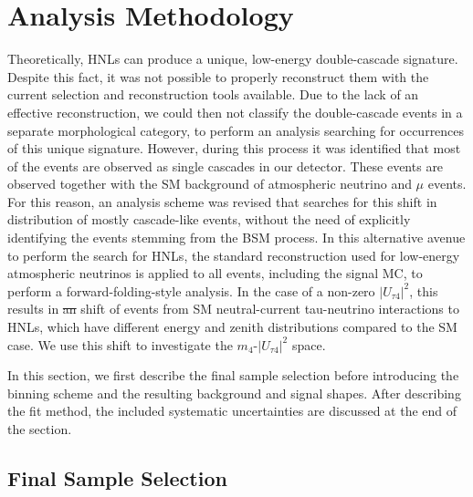 \documentclass[
    aps,
    prd,
    reprint,
    amsmath,
    amssymb,
    nofootinbib,
    superscriptaddress,
    floatfix
]{revtex4-2}
\def\ut4{$|U_{\tau4}|^2$}
\providecommand{\DIFaddtex}[1]{{\protect\color{blue}\uwave{#1}}} %
\providecommand{\DIFdeltex}[1]{{\protect\color{red}\sout{#1}}}                      %
\providecommand{\DIFaddbegin}{} %
\providecommand{\DIFaddend}{} %
\providecommand{\DIFdelbegin}{} %
\providecommand{\DIFdelend}{} %
\providecommand{\DIFadd}[1]{\texorpdfstring{\DIFaddtex{#1}}{#1}} %
\providecommand{\DIFdel}[1]{\texorpdfstring{\DIFdeltex{#1}}{}} %
\newcommand{\DIFscaledelfig}{0.5}
\newlength{\DIFdelgraphicswidth} %
\newlength{\DIFdelgraphicsheight} %
\newcommand{\DIFaddincludegraphics}[2][]{{\color{blue}\fbox{\DIFOincludegraphics[#1]{#2}}}} %
\newcommand{\DIFdelincludegraphics}[2][]{%
\sbox{\DIFdelgraphicsbox}{\DIFOincludegraphics[#1]{#2}}%
\settoboxwidth{\DIFdelgraphicswidth}{\DIFdelgraphicsbox} %
\settoboxtotalheight{\DIFdelgraphicsheight}{\DIFdelgraphicsbox} %
\scalebox{\DIFscaledelfig}{%
\parbox[b]{\DIFdelgraphicswidth}{\usebox{\DIFdelgraphicsbox}\\[-\baselineskip] \rule{\DIFdelgraphicswidth}{0em}}\llap{\resizebox{\DIFdelgraphicswidth}{\DIFdelgraphicsheight}{%
\setlength{\unitlength}{\DIFdelgraphicswidth}%
\begin{picture}(1,1)%
\thicklines\linethickness{2pt} %
{\color[rgb]{1,0,0}\put(0,0){\framebox(1,1){}}}%
{\color[rgb]{1,0,0}\put(0,0){\line( 1,1){1}}}%
{\color[rgb]{1,0,0}\put(0,1){\line(1,-1){1}}}%
\end{picture}%
}\hspace*{3pt}}} %
} %
\DeclareRobustCommand{\DIFaddbegin}{\DIFOaddbegin \let\includegraphics\DIFaddincludegraphics} %
\DeclareRobustCommand{\DIFaddend}{\DIFOaddend \let\includegraphics\DIFOincludegraphics} %
\DeclareRobustCommand{\DIFdelbegin}{\DIFOdelbegin \let\includegraphics\DIFdelincludegraphics} %
\DeclareRobustCommand{\DIFdelend}{\DIFOaddend \let\includegraphics\DIFOincludegraphics} %
\begin{document}

\section{\label{sec:analysis_methods}Analysis Methodology}

Theoretically, HNLs can produce a unique, low-energy double-cascade signature. Despite this fact, it was not possible to properly reconstruct them with the current selection and reconstruction tools available. Due to the lack of an effective reconstruction, we could then not classify the double-cascade events in a separate morphological category, to perform an analysis searching for occurrences of this unique signature. However, during this process it was identified that most of the events are observed as single cascades in our detector.
These events are observed together with the SM background of atmospheric neutrino and $\mu$ events. For this reason, an analysis scheme was revised that searches for this shift in distribution of mostly cascade-like events, without the need of explicitly identifying the events stemming from the BSM process.
In this alternative avenue to perform the search for HNLs, the standard reconstruction used for low-energy atmospheric neutrinos is applied to all events, including the signal MC, to perform a forward-folding-style analysis. %
In the case of a non-zero \ut4, this results in \DIFdelbegin \DIFdel{an }\DIFdelend \DIFaddbegin \DIFadd{a }\DIFaddend shift of events from SM neutral-current tau-neutrino interactions to HNLs, which have different energy and zenith distributions compared to the SM case. We use this shift to investigate the $m_4$-\ut4 space.

In this section, we first describe the final sample selection before introducing the binning scheme and the resulting background and signal shapes. After describing the fit method, the included systematic uncertainties are discussed at the end of the section.


\subsection{\label{sec:sample}Final Sample Selection}
\end{document}
